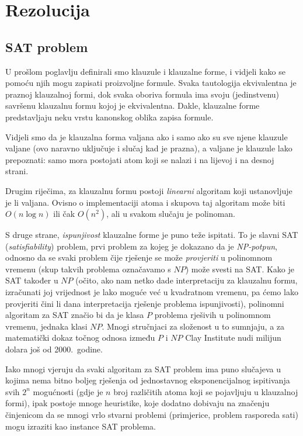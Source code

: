 \chapter{Rezolucija}

\section{SAT problem}

U prošlom poglavlju definirali smo klauzule i klauzalne forme, i vidjeli kako se pomoću njih mogu zapisati proizvoljne formule. Svaka tautologija ekvivalentna je praznoj klauzalnoj formi, dok svaka oboriva formula ima svoju (jedinstvenu) savršenu klauzalnu formu kojoj je ekvivalentna. Dakle, klauzalne forme predstavljaju neku vrstu kanonskog oblika zapisa formule.

Vidjeli smo da je klauzalna forma valjana ako i samo ako su sve njene klauzule valjane (ovo naravno uključuje i slučaj kad je prazna), a valjane je klauzule lako prepoznati: samo mora postojati atom koji se nalazi i na lijevoj i na desnoj strani.

Drugim riječima, za klauzalnu formu postoji \emph{linearni} algoritam koji ustanovljuje je li valjana. Ovisno o implementaciji atoma i skupova taj algoritam može biti $O(n\log n)$ ili čak $O(n^2)$, ali u svakom slučaju je polinoman.

S druge strane, \emph{ispunjivost} klauzalne forme je puno teže ispitati. To je slavni SAT (\emph{satisfiability}) problem, prvi problem za kojeg je dokazano da je \emph{NP-potpun}, odnosno da se svaki problem čije rješenje se može \emph{provjeriti} u polinomnom vremenu (skup takvih problema označavamo s $NP$) može svesti na SAT. Kako je SAT također u $NP$ (očito, ako nam netko dade interpretaciju za klauzalnu formu, izračunati joj vrijednost je lako moguće već u kvadratnom vremenu, pa ćemo lako provjeriti čini li dana interpretacija rješenje problema ispunjivosti), polinomni algoritam za SAT značio bi da je klasa $P$ problema rješivih u polinomnom vremenu, jednaka klasi $NP$. Mnogi stručnjaci za složenost u to sumnjaju, a za matematički dokaz točnog odnosa između $P$ i $NP$ Clay Institute nudi milijun dolara još od 2000.\ godine.

Iako mnogi vjeruju da svaki algoritam za SAT problem ima puno slu\-ča\-je\-va u kojima nema bitno boljeg rješenja od jednostavnog eksponencijalnog ispitivanja svih $2^n$ mogućnosti (gdje je $n$ broj različitih atoma koji se pojavljuju u klauzalnoj formi), ipak postoje mnoge heuristike, koje dodatno dobivaju na značenju činjenicom da se mnogi vrlo stvarni problemi (primjerice, problem rasporeda sati) mogu izraziti kao instance SAT problema.


